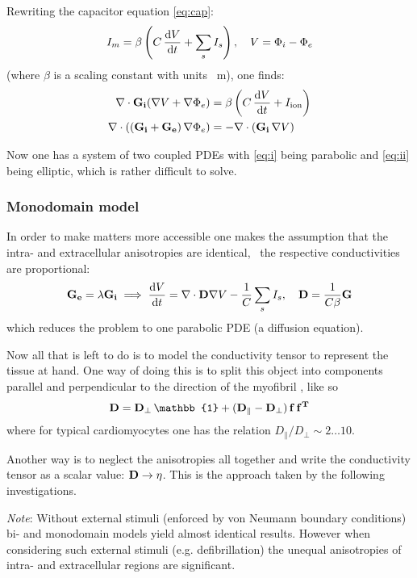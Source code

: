 Rewriting the capacitor equation \eqref{eq:cap}:
\begin{equation}
    I_m=\beta\left(C\,\dv{V}{t}+\sum_{s}I_{s}\right),\quad V=\Phi_i-\Phi_e
\end{equation}
(where $\beta$ is a scaling constant with units \si{\per\metre}), one finds:
\begin{subequations}
\begin{align}
    \nabla\cdot\mathbf{G_i}(\nabla{V}+\nabla\Phi_e)
    &=\beta\left(C\,\dv{V}{t}+I_{\mathrm{ion}}\right)
    \label{eq:i}
    \\
    \nabla\cdot\left((\mathbf{G_i}+\mathbf{G_e})\,\nabla\Phi_e\right)
    &=-\nabla\cdot(\mathbf{G_i}\,\nabla{V})
    \label{eq:ii}
\end{align}
\end{subequations}

Now one has a system of two coupled PDEs with \eqref{eq:i} being parabolic
and \eqref{eq:ii} being elliptic, which is rather difficult to solve.

\subsubsection{Monodomain model}
In order to make matters more accessible one makes the assumption that the
intra- and extracellular anisotropies are identical, \ie~the respective
conductivities are proportional:
\begin{equation}
    \mathbf{G_e}=\lambda\mathbf{G_i} \implies
    \dv{V}{t}=\nabla\cdot{\ensuremath{\mathbf{D}}}\nabla{V}-\frac{1}{C}\sum_{s}I_{s},
    \quad \mathbf{D}=\frac{1}{C\beta}\mathbf{G}
\end{equation}
which reduces the problem to one parabolic PDE (a diffusion equation).

Now all that is left to do is to model the conductivity tensor  to
represent the tissue at hand.
One way of doing this is to split this object
into components parallel and perpendicular to the direction of the
myofibril , like so
\begin{equation}
    \myten{D}=\myten{D_{\perp}}\,\mathbb{1}+(\myten{D_{\parallel}}
    -\myten{D_{\perp}})\,\myvec{f}\,\myvec{f^T}
\end{equation}
where for typical cardiomyocytes one has the relation
$D_{\parallel}/D_{\perp}\sim2\ldots10$.

Another way is to neglect the anisotropies all together and write the
conductivity tensor as a scalar value: $\mathbf{D}\to\eta$. This is the
approach taken by the following investigations.

\vspace{\baselineskip}
\emph{Note}: Without external stimuli (enforced by von Neumann boundary
conditions) bi- and monodomain models yield almost identical results.
However when considering such external stimuli (e.g. defibrillation) the
unequal anisotropies of intra- and extracellular regions are significant.


